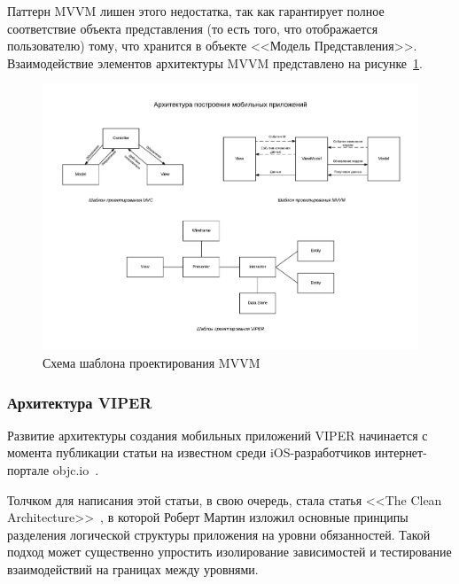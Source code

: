 Паттерн MVVM лишен этого недостатка, так как гарантирует полное
соответствие объекта представления (то есть того, что отображается пользователю) тому,
что хранится в объекте <<Модель Представления>>.
Взаимодействие элементов архитектуры MVVM представлено на рисунке~\ref{fig:mvvm}.
\begin{figure}[h!]
  \centering
  \includegraphics[width=130mm]{fig/mvvm}
  \caption{Схема шаблона проектирования MVVM}
  \label{fig:mvvm}
\end{figure}



\subsubsection{Архитектура VIPER}

Развитие архитектуры создания мобильных приложений VIPER начинается
с момента публикации статьи на известном среди iOS-разработчиков
интернет-портале objc.io~\cite{viper_objc_io}.

Толчком для написания этой статьи, в свою очередь,
стала статья <<The Clean Architecture>>~\cite{clean_architecture},
в которой Роберт Мартин изложил основные принципы разделения логической
структуры приложения на уровни обязанностей. Такой подход может
существенно упростить изолирование зависимостей и тестирование взаимодействий
на границах между уровнями.

